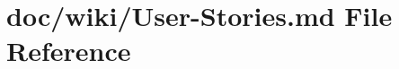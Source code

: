 \hypertarget{_user-_stories_8md}{}\section{doc/wiki/\+User-\/\+Stories.md File Reference}
\label{_user-_stories_8md}
